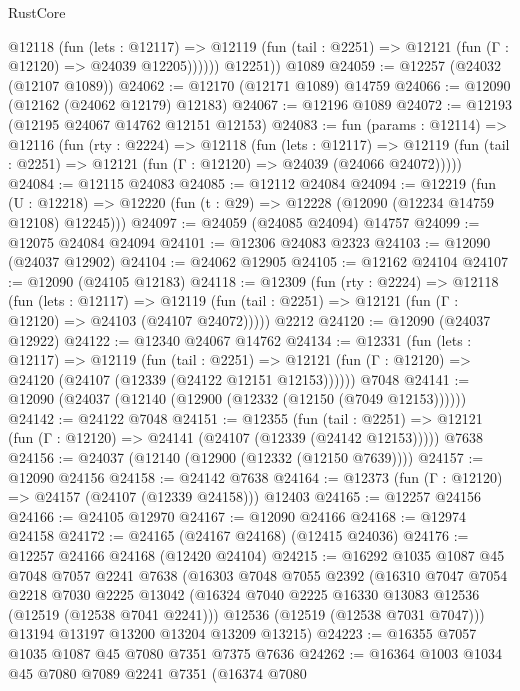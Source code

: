 \begin{lexlean}{RustCore}
\begin{coremodule}
            @12118
              (fun (lets : @12117) =>
              @12119 (fun (tail : @2251) => @12121 (fun (Γ : @12120) => @24039 @12205))))))
        @12251))
    @1089
@24059 := @12257 (@24032 (@12107 @1089))
@24062 := @12170 (@12171 @1089) @14759
@24066 := @12090 (@12162 (@24062 @12179) @12183)
@24067 := @12196 @1089
@24072 := @12193 (@12195 @24067 @14762 @12151 @12153)
@24083 := fun (params : @12114) =>
  @12116
    (fun (rty : @2224) =>
    @12118
      (fun (lets : @12117) =>
      @12119 (fun (tail : @2251) => @12121 (fun (Γ : @12120) => @24039 (@24066 @24072)))))
@24084 := @12115 @24083
@24085 := @12112 @24084
@24094 := @12219
    (fun (U : @12218) => @12220 (fun (t : @29) => @12228 (@12090 (@12234 @14759 @12108) @12245)))
@24097 := @24059 (@24085 @24094) @14757
@24099 := @12075 @24084 @24094
@24101 := @12306 @24083 @2323
@24103 := @12090 (@24037 @12902)
@24104 := @24062 @12905
@24105 := @12162 @24104
@24107 := @12090 (@24105 @12183)
@24118 := @12309
    (fun (rty : @2224) =>
    @12118
      (fun (lets : @12117) =>
      @12119 (fun (tail : @2251) => @12121 (fun (Γ : @12120) => @24103 (@24107 @24072)))))
    @2212
@24120 := @12090 (@24037 @12922)
@24122 := @12340 @24067 @14762
@24134 := @12331
    (fun (lets : @12117) =>
    @12119
      (fun (tail : @2251) =>
      @12121 (fun (Γ : @12120) => @24120 (@24107 (@12339 (@24122 @12151 @12153))))))
    @7048
@24141 := @12090 (@24037 (@12140 (@12900 (@12332 (@12150 (@7049 @12153))))))
@24142 := @24122 @7048
@24151 := @12355
    (fun (tail : @2251) => @12121 (fun (Γ : @12120) => @24141 (@24107 (@12339 (@24142 @12153)))))
    @7638
@24156 := @24037 (@12140 (@12900 (@12332 (@12150 @7639))))
@24157 := @12090 @24156
@24158 := @24142 @7638
@24164 := @12373 (fun (Γ : @12120) => @24157 (@24107 (@12339 @24158))) @12403
@24165 := @12257 @24156
@24166 := @24105 @12970
@24167 := @12090 @24166
@24168 := @12974 @24158
@24172 := @24165 (@24167 @24168) (@12415 @24036)
@24176 := @12257 @24166 @24168 (@12420 @24104)
@24215 := @16292
    @1035
    @1087
    @45
    @7048
    @7057
    @2241
    @7638
    (@16303
      @7048
      @7055
      @2392
      (@16310
        @7047
        @7054
        @2218
        @7030
        @2225
        @13042
        (@16324 @7040 @2225 @16330 @13083 @12536 (@12519 (@12538 @7041 @2241)))
        @12536
        (@12519 (@12538 @7031 @7047)))
      @13194
      @13197
      @13200
      @13204
      @13209
      @13215)
@24223 := @16355 @7057 @1035 @1087 @45 @7080 @7351 @7375 @7636
@24262 := @16364
    @1003
    @1034
    @45
    @7080
    @7089
    @2241
    @7351
    (@16374
      @7080

\end{coremodule}
\end{lexlean}
